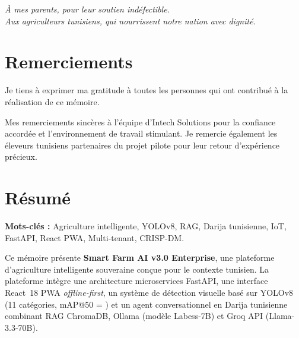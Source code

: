 \cleardoublepage
\thispagestyle{empty}
\vspace*{\fill}
\begin{center}
\itshape
À mes parents, pour leur soutien indéfectible.\\
Aux agriculteurs tunisiens, qui nourrissent notre nation avec dignité.
\end{center}
\vspace*{\fill}

\cleardoublepage
\thispagestyle{empty}
\chapter*{Remerciements}
Je tiens à exprimer ma gratitude à toutes les personnes qui ont contribué
à la réalisation de ce mémoire.

Mes remerciements sincères à l'équipe d'Intech Solutions pour la confiance
accordée et l'environnement de travail stimulant. Je remercie également
les éleveurs tunisiens partenaires du projet pilote pour leur retour
d'expérience précieux.

\cleardoublepage
\thispagestyle{empty}
\chapter*{Résumé}
\begin{tcolorbox}[colback=gray!5,colframe=gray!50]
\textbf{Mots-clés :} Agriculture intelligente, YOLOv8, RAG, Darija tunisienne,
IoT, FastAPI, React PWA, Multi-tenant, CRISP-DM.
\end{tcolorbox}

\medskip
Ce mémoire présente \textbf{Smart Farm AI v3.0 Enterprise}, une plateforme
d'agriculture intelligente souveraine conçue pour le contexte tunisien.
La plateforme intègre une architecture microservices FastAPI, une interface
React~18 PWA \textit{offline-first}, un système de détection visuelle basé
sur YOLOv8 (11 catégories, mAP@50 = ) et un agent
conversationnel en Darija tunisienne combinant RAG ChromaDB, Ollama
(modèle Labess-7B) et Groq API (Llama-3.3-70B).


